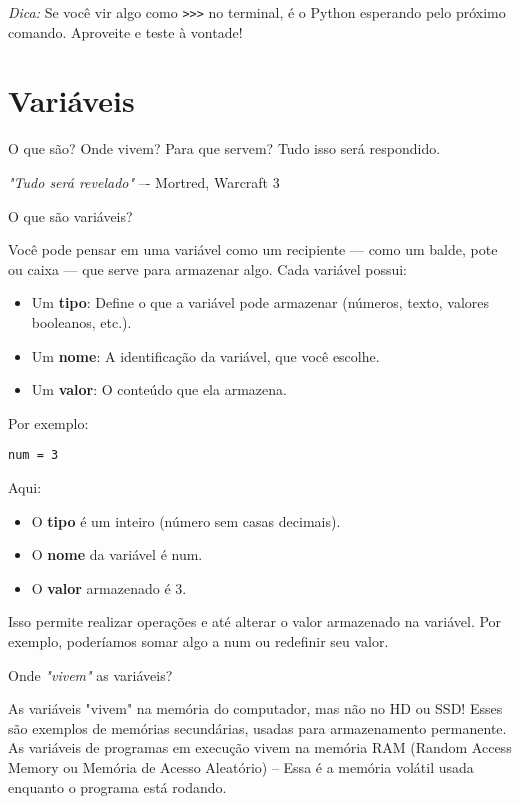 \documentclass[12pt]{book}
\begin{document}
	\textit{Dica:} Se você vir algo como \texttt{>{>}>} no terminal, é o Python esperando pelo próximo comando. Aproveite e teste à vontade!
	
	\section{Variáveis}
	
	O que são? Onde vivem? Para que servem? Tudo isso será respondido.
	
	\hspace*{12mm}\textit{"Tudo será revelado"} –- Mortred, Warcraft 3\newline
	
	O que são variáveis?
	
	Você pode pensar em uma variável como um recipiente — como um balde, pote ou caixa — que serve para armazenar algo. Cada variável possui:
	
	\begin{itemize}
	\item Um \textbf{tipo}: Define o que a variável pode armazenar (números, texto, valores booleanos, etc.).
	\item Um \textbf{nome}: A identificação da variável, que você escolhe.
	\item Um \textbf{valor}: O conteúdo que ela armazena.
	\end{itemize}
	Por exemplo: 
	\begin{lstlisting}[caption={código simples}]
num = 3\end{lstlisting}
	
	Aqui:
	
	\begin{itemize}
		\item O \textbf{tipo} é um inteiro (número sem casas decimais).
		\item O \textbf{nome} da variável é num.
		\item O \textbf{valor} armazenado é 3.
	\end{itemize}
	
	
	Isso permite realizar operações e até alterar o valor armazenado na variável. Por exemplo, poderíamos somar algo a num ou redefinir seu valor.
	
	Onde \textit{"vivem"} as variáveis?
	
	As variáveis "vivem" na memória do computador, mas não no HD ou SSD! Esses são exemplos de memórias secundárias, usadas para armazenamento permanente. As variáveis de programas em execução vivem na memória RAM (Random Access Memory ou Memória de Acesso Aleatório) -- Essa é a memória volátil usada enquanto o programa está rodando.
	
\end{document}
